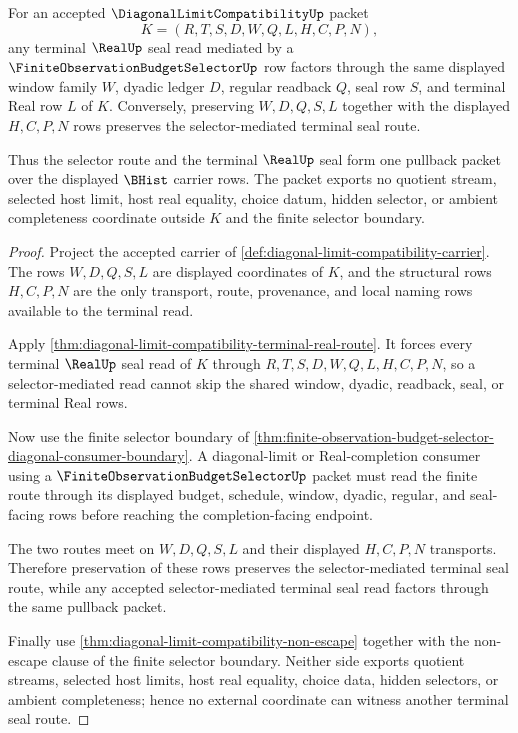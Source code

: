 \begin{theorem}
\label{thm:diagonal-limit-compatibility-terminal-selector-real-seal-pullback}
For an accepted $\DiagonalLimitCompatibilityUp$ packet
$$
K=(R,T,S,D,W,Q,L,H,C,P,N),
$$
any terminal $\RealUp$ seal read mediated by a $\FiniteObservationBudgetSelectorUp$ row factors through the same displayed window family $W$, dyadic ledger $D$, regular readback $Q$, seal row $S$, and terminal Real row $L$ of $K$. Conversely, preserving $W,D,Q,S,L$ together with the displayed $H,C,P,N$ rows preserves the selector-mediated terminal seal route.

Thus the selector route and the terminal $\RealUp$ seal form one pullback packet over the displayed $\BHist$ carrier rows. The packet exports no quotient stream, selected host limit, host real equality, choice datum, hidden selector, or ambient completeness coordinate outside $K$ and the finite selector boundary.
\end{theorem}
\begin{proof}
Project the accepted carrier of \autoref{def:diagonal-limit-compatibility-carrier}. The rows $W,D,Q,S,L$ are displayed coordinates of $K$, and the structural rows $H,C,P,N$ are the only transport, route, provenance, and local naming rows available to the terminal read.

Apply \autoref{thm:diagonal-limit-compatibility-terminal-real-route}. It forces every terminal $\RealUp$ seal read of $K$ through $R,T,S,D,W,Q,L,H,C,P,N$, so a selector-mediated read cannot skip the shared window, dyadic, readback, seal, or terminal Real rows.

Now use the finite selector boundary of \autoref{thm:finite-observation-budget-selector-diagonal-consumer-boundary}. A diagonal-limit or Real-completion consumer using a $\FiniteObservationBudgetSelectorUp$ packet must read the finite route through its displayed budget, schedule, window, dyadic, regular, and seal-facing rows before reaching the completion-facing endpoint.

The two routes meet on $W,D,Q,S,L$ and their displayed $H,C,P,N$ transports. Therefore preservation of these rows preserves the selector-mediated terminal seal route, while any accepted selector-mediated terminal seal read factors through the same pullback packet.

Finally use \autoref{thm:diagonal-limit-compatibility-non-escape} together with the non-escape clause of the finite selector boundary. Neither side exports quotient streams, selected host limits, host real equality, choice data, hidden selectors, or ambient completeness; hence no external coordinate can witness another terminal seal route.
\end{proof}


